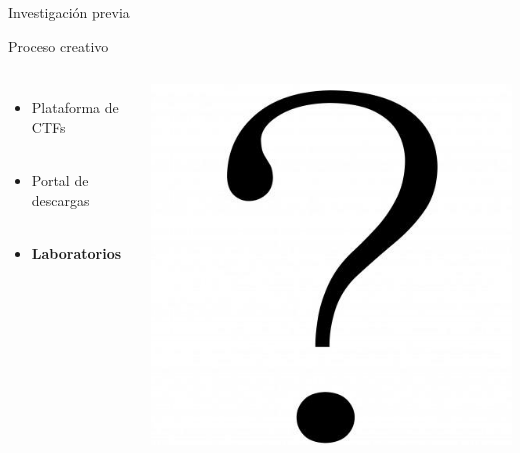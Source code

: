     \begin{frame}
        \Huge{\centerline{Investigación previa}}
    \end{frame}

    \begin{frame}{Proceso creativo}
        \begin{columns}[c]
                \begin{itemize}
                    \item Plataforma de CTFs
                    \\~\\
                    \item Portal de descargas
                    \\~\\
                    \item \textbf{Laboratorios}
                \end{itemize}
            
                \includegraphics[scale=0.25]{images/interrogacion.png}
        \end{columns}
    \end{frame}

